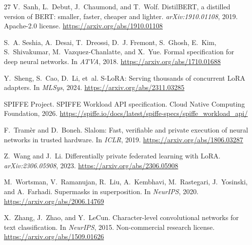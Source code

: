 \documentclass[11pt,a4paper]{article}
\begin{document}
\begin{thebibliography}{27}
V.~Sanh, L.~Debut, J.~Chaumond, and T.~Wolf.
\newblock DistilBERT, a distilled version of BERT: smaller, faster, cheaper and lighter.
\newblock \emph{arXiv:1910.01108}, 2019.
\newblock Apache-2.0 license.
\newblock \url{https://arxiv.org/abs/1910.01108}

S.~A. Seshia, A.~Desai, T.~Dreossi, D.~J. Fremont, S.~Ghosh,
  E.~Kim, S.~Shivakumar, M.~Vazquez-Chanlatte, and X.~Yue.
\newblock Formal specification for deep neural networks.
\newblock In \emph{ATVA}, 2018.
\newblock \url{https://arxiv.org/abs/1710.01688}

Y.~Sheng, S.~Cao, D.~Li, et~al.
\newblock S-LoRA: Serving thousands of concurrent LoRA adapters.
\newblock In \emph{MLSys}, 2024.
\newblock \url{https://arxiv.org/abs/2311.03285}

SPIFFE Project.
\newblock SPIFFE Workload API specification.
\newblock Cloud Native Computing Foundation, 2026.
\newblock \url{https://spiffe.io/docs/latest/spiffe-specs/spiffe_workload_api/}

F.~Tram\`er and D.~Boneh.
\newblock Slalom: Fast, verifiable and private execution of neural networks in trusted hardware.
\newblock In \emph{ICLR}, 2019.
\newblock \url{https://arxiv.org/abs/1806.03287}

Z.~Wang and J.~Li.
\newblock Differentially private federated learning with LoRA.
\newblock \emph{arXiv:2306.05908}, 2023.
\newblock \url{https://arxiv.org/abs/2306.05908}

M.~Wortsman, V.~Ramanujan, R.~Liu, A.~Kembhavi, M.~Rastegari,
J.~Yosinski, and A.~Farhadi.
\newblock Supermasks in superposition.
\newblock In \emph{NeurIPS}, 2020.
\newblock \url{https://arxiv.org/abs/2006.14769}

X.~Zhang, J.~Zhao, and Y.~LeCun.
\newblock Character-level convolutional networks for text classification.
\newblock In \emph{NeurIPS}, 2015.
\newblock Non-commercial research license.
\newblock \url{https://arxiv.org/abs/1509.01626}

\end{thebibliography}
\end{document}
